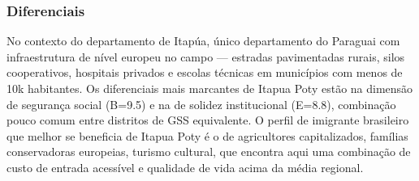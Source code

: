 \subsubsection*{Diferenciais}\label{dif-itapua-poty-0730}
No contexto do departamento de Itapúa, único departamento do Paraguai com infraestrutura de nível europeu no campo — estradas pavimentadas rurais, silos cooperativos, hospitais privados e escolas técnicas em municípios com menos de 10k habitantes. Os diferenciais mais marcantes de Itapua Poty estão na dimensão de segurança social (B=9.5) e na de solidez institucional (E=8.8), combinação pouco comum entre distritos de GSS equivalente. O perfil de imigrante brasileiro que melhor se beneficia de Itapua Poty é o de agricultores capitalizados, famílias conservadoras europeias, turismo cultural, que encontra aqui uma combinação de custo de entrada acessível e qualidade de vida acima da média regional.
